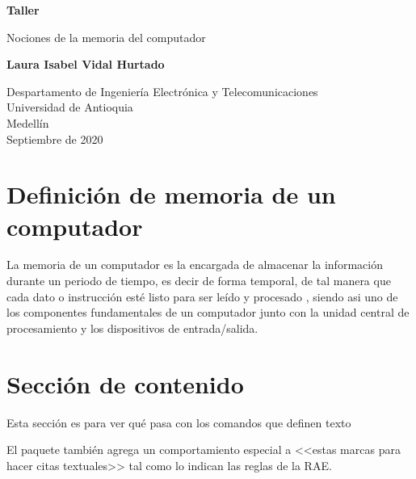 \documentclass{article}
\begin{document}
\begin{titlepage}
    \begin{center}
        \vspace*{1cm}
            
        \Huge
        \textbf{Taller}
            
        \vspace{0.5cm}
        \LARGE
        Nociones de la memoria del computador
            
        \vspace{1.5cm}
            
        \textbf{Laura Isabel Vidal Hurtado}
            
        \vfill
            
        \vspace{0.8cm}
            
        \Large
        Despartamento de Ingeniería Electrónica y Telecomunicaciones\\
        Universidad de Antioquia\\
        Medellín\\
        Septiembre de 2020
            
    \end{center}
\end{titlepage}

\tableofcontents

\section{Definición de memoria de un computador}

La memoria de un computador es la encargada de almacenar la información durante un periodo de tiempo, es decir de forma temporal, de tal manera que cada dato o instrucción esté listo para ser leído y procesado , siendo asi uno de los componentes fundamentales de un computador junto con la unidad central de procesamiento y los dispositivos de entrada/salida.

\section{Sección de contenido} \label{contenido}

Esta sección es para ver qué pasa con los comandos 
que definen texto

El paquete también agrega un comportamiento especial 
a <<estas marcas para hacer citas textuales>> tal como 
lo indican las reglas de la RAE. \cite{dirac}
\cite{knuthwebsite}
\end{document}
